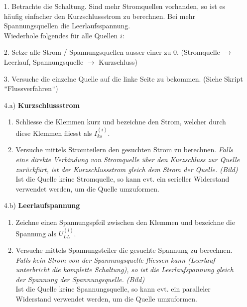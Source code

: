 																				\newpage
																				\beginvor
																				\begin{itemize}

																				  \item[1.] Betrachte die Schaltung. Sind mehr Stromquellen vorhanden, so ist es häufig einfacher den Kurzschlussstrom zu berechnen. Bei mehr Spannungsquellen die Leerlaufsspannung. \\
																				  Wiederhole folgendes für alle Quellen $i$: \\
																				  \end{itemize}
																				  \beginip
																				  \begin{itemize}

																				  \item [2.  ]  Setze alle Strom / Spannungsquellen ausser einer zu 0. (Stromquelle $\rightarrow$ Leerlauf, Spannungsquelle $\rightarrow$ Kurzschluss)
																				  \item[3. ] Versuche die einzelne Quelle auf die linke Seite zu bekommen. (Siehe Skript \texttt{"}Flussverfahren\texttt{"})
																				  \item[4.a)] \textbf{Kurzschlussstrom}
																				  \begin{enumerate}
																				  \item Schliesse die Klemmen kurz und bezeichne den Strom, welcher durch diese Klemmen fliesst als $I_{ks}^{(i)}$.
																				  \item Versuche mittels Stromteilern den gesuchten Strom zu berechnen. \textit{Falls eine direkte Verbindung von Stromquelle über den Kurzschluss zur Quelle zurückfürt, ist der Kurzschlussstrom gleich dem Strom der Quelle. (Bild)}\\
																				  Ist die Quelle keine Stromquelle, so kann evt. ein serieller Widerstand verwendet werden, um die Quelle umzuformen.
																				  \end{enumerate}
																				  \item[4.b)] \textbf{Leerlaufspannung}
																				  \begin{enumerate}
																				  \item Zeichne einen Spannungspfeil zwischen den Klemmen und bezeichne die Spannung als $U_{LL}^{(i)}$.
																				  \item Versuche mittels Spannungsteiler die gesuchte Spannung zu berechnen. \textit{Falls kein Strom von der Spannungsquelle fliessen kann (Leerlauf unterbricht die komplette Schaltung), so ist die Leerlaufspannung gleich der Spannung der Spannungsquelle. (Bild)} \\
																				  Ist die Quelle keine Spannungsquelle, so kann evt. ein paralleler Widerstand verwendet werden, um die Quelle umzuformen.
																				  \end{enumerate}
																				\end{itemize}

